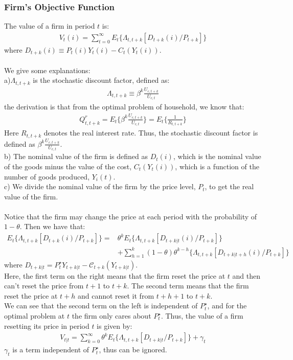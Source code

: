 \documentclass{article}
\numberwithin{equation}{section}
\begin{document}
\subsubsection{Firm's Objective Function}
The value of a firm in period $t$ is:
	\begin{align*}
		V_t(i) = \sum\limits^\infty_{t=0} E_t\{\Lambda_{t,t+k}[D_{t+k}(i)/P_{t+k}]\}
	\end{align*}
where $D_{t+k}(i) \equiv P_t(i)Y_t(i) - C_t(Y_t(i))$.\\\\
We give some explanations:\\
a)$\Lambda_{t,t+k}$ is the stochastic discount factor, defined as:
	\begin{align*}
		\Lambda_{t,t+k} \equiv \beta^k \frac{U_{c,t+k}}{U_{c,t}}
	\end{align*}
the derivation is that from the optimal problem of household, we know that:
	\begin{align*}
		Q^r_{t,t+k} = E_t\{\beta^k \frac{U_{c,t+k}}{U_{c,t}}\} = E_t\{\frac{1}{R_{t,t+k}}\}
	\end{align*} 
Here $R_{t,t+k}$ denotes the real interest rate. Thus, the stochastic discount factor is defined as $\beta^k \frac{U_{c,t+k}}{U_{c,t}}$.\\
b) The nominal value of the firm is defined as $D_t(i)$, which is the nominal value of the goods minus the value of the cost, $C_t(Y_t(i))$, which is a function of the number of goods produced, $Y_i(t)$.\\
c) We divide the nominal value of the firm by the price level, $P_t$, to get the real value of the firm.\\\\
Notice that the firm may change the price at each period with the probability of $1 - \theta$. Then we have that:
	\begin{align*}
		E_t\{\Lambda_{t,t+k}[D_{t+k}(i)/P_{t+k}]\} = &\theta^k E_t\{\Lambda_{t,t+k}[D_{t+k|t}(i)/P_{t+k}]\}\\ &+ \sum\limits^k_{h=1}(1 - \theta)\theta^{k-h}\{\Lambda_{t,t+k}[D_{t+k|t+h}(i)/P_{t+k}]\}
	\end{align*}
where $D_{t+k|t} = P^\star_t Y_{t+k|t} - \mathscr{C}_{t+k}(Y_{t+k|t})$.\\
Here, the first term on the right means that the firm reset the price at $t$ and then can't reset the price from $t+1$ to $t+k$. The second term means that the firm reset the price at $t+h$ and cannot reset it from $t+h+1$ to $t+k$.\\
We can see that the second term on the left is independent of $P^\star_t$, and for the optimal problem at $t$ the firm only cares about $P^\star_t$. Thus, the value of a firm resetting its price in period $t$ is given by:
	\begin{align}
		V_{t|t} = \sum\limits^\infty_{k=0} \theta^k E_t\{\Lambda_{t,t+k}[D_{t+k|t}/P_{t+k}]\} + \gamma_t \label{app 1.3.1}
	\end{align}
$\gamma_t$ is a term independent of $P^\star_t$, thus can be ignored.
\end{document}
